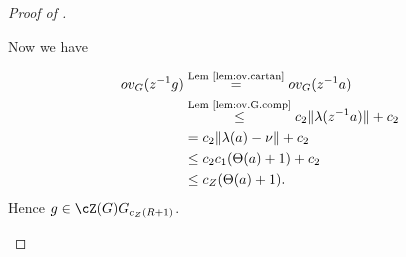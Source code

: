 \documentclass[12pt,a4paper]{amsart}%
\newcommand{\RamiC}[1]{{{#1}}}
\begin{document}
\begin{proof}[Proof of ]
\begin{enumerate}[Step 1.]
Now we have 

\RamiC{
\begin{align*}
ov_G(z^{-1}g)&\overset{\text{Lem \ref{lem:ov.cartan}}}{=}ov_G(z^{-1}a)\\
&\overset{\text{Lem \ref{lem:ov.G.comp}}}{\leq}c_2\|\lambda(z^{-1}a)\|+c_2\\
&=c_2\|\lambda(a)-\nu\|+c_2\\
&\leq c_2c_1(\Theta(a)+1)+c_2\\
&\leq c_Z(\Theta(a)+1).
\end{align*}
}
Hence $g\in \cZ(G)G_{c_Z(R+1)}$.
\end{enumerate}
\end{proof}
\end{document}
